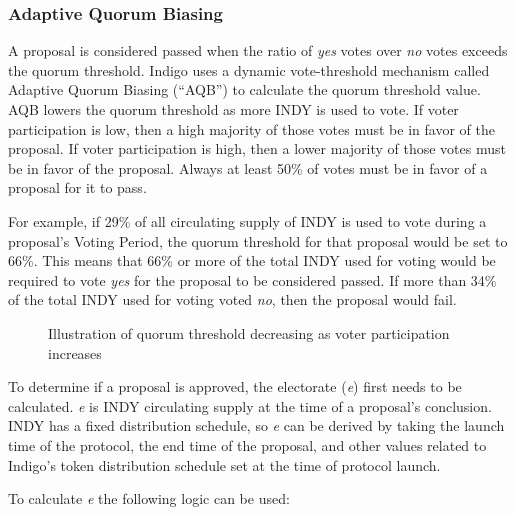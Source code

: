 \documentclass{article}
\begin{document}
\begin{sloppypar}
\hypertarget{adaptive-quorum-biasing}{%
\subsubsection{Adaptive Quorum Biasing}\label{adaptive-quorum-biasing}}

A proposal is considered passed when the ratio of \emph{yes} votes over
\emph{no} votes exceeds the quorum threshold. Indigo uses a dynamic
vote-threshold mechanism called Adaptive Quorum Biasing (``AQB'') to
calculate the quorum threshold value. AQB lowers the quorum threshold as
more INDY is used to vote. If voter participation is low, then a high
majority of those votes must be in favor of the proposal. If voter
participation is high, then a lower majority of those votes must be in
favor of the proposal. Always at least 50\% of votes must be in favor of
a proposal for it to pass.

For example, if 29\% of all circulating supply of INDY is used to vote
during a proposal's Voting Period, the quorum threshold for that
proposal would be set to 66\%. This means that 66\% or more of the total
INDY used for voting would be required to vote \emph{yes} for the
proposal to be considered passed. If more than 34\% of the total INDY
used for voting voted \emph{no}, then the proposal would fail.

\hypertarget{quorum-threshold}{%
\begin{figure}[htbp]
\centering

\caption{Illustration of quorum threshold decreasing as voter
participation increases}
\end{figure}}

\filbreak

To determine if a proposal is approved, the electorate (\emph{e}) first
needs to be calculated. \emph{e} is INDY circulating supply at the time
of a proposal's conclusion. INDY has a fixed distribution schedule, so
\emph{e} can be derived by taking the launch time of the protocol, the
end time of the proposal, and other values related to Indigo's token
distribution schedule set at the time of protocol launch.

To calculate \emph{e} the following logic can be used:


\end{sloppypar}
\end{document}
